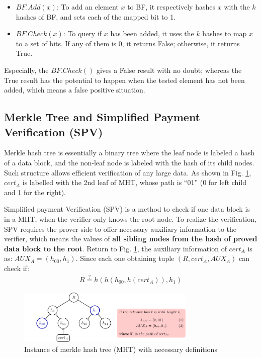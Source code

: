 \documentclass[conference]{IEEEtran}
\begin{document}
\begin{itemize}
    \item $BF.Add(x)$: To add an element $x$ to BF, it respectively hashes $x$ with the $k$ hashes of BF, and sets each of the mapped bit to 1.
	\item $BF.Check(x)$: To query if $x$ has been added, it uses the $k$ hashes to map $x$ to a set of bits. If any of them is 0, it returns False; otherwise, it returns True. 
\end{itemize}

Especially, the $BF.Check()$ gives a False result with no doubt; whereas the True result has the potential to happen when the tested element has not been added, which means a false positive situation. 

\subsection{Merkle Tree and Simplified Payment Verification (SPV)}
\label{section:merkle}
Merkle hash tree \cite{daiSBLWTSecureBlockchain2018} is essentially a binary tree where the leaf node is labeled a hash of a data block, and the non-leaf node is labeled with the hash of its child nodes. Such structure allows efficient verification of any large data. As shown in Fig. \ref{fig:mht}, $cert_A$ is labelled with the 2nd leaf of MHT, whose path is ``01'' (0 for left child and 1 for the right).

Simplified payment Verification (SPV) is a method to check if one data block is in a MHT, when the verifier only knows the root node. To realize the verification, SPV requires the prover side to offer necessary auxiliary information to the verifier, which means the values of \textbf{all sibling nodes from the hash of proved data block to the root}.
Return to Fig. \ref{fig:mht}, the auxiliary information of $cert_A$ is as: $AUX_A = (h_{00}, h_{1})$. Since each one obtaining tuple $(R, cert_A, AUX_A)$ can check if:
\begin{align}\label{eq:aux}
R \overset{?}{=} h(h(h_{00}, h(cert_A)), h_1)
\end{align}

\begin{figure}[t]
	\centering
	\includegraphics[width=8.5cm]{mht}
	\caption{Instance of merkle hash tree (MHT) with necessary definitions}\label{fig:mht}
\end{figure}
\end{document}

